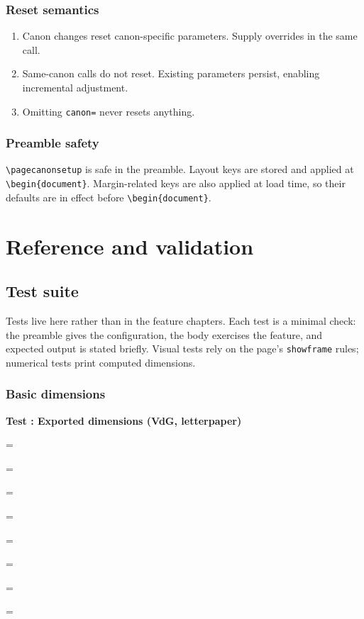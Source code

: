 \documentclass[11pt, twoside, openany]{book}
\newcommand{\showlen}[2]{\noindent\texttt{#1} = \the#2\par}
\newcommand{\cmd}[1]{\texttt{\textbackslash #1}}
\newcounter{testnum}
\newcommand{\test}[1]{%
  \stepcounter{testnum}%
  \par\medskip\noindent
  \textbf{Test \thetestnum: #1}\par\smallskip}
\begin{document}
\section{Reset semantics}\label{sec:reset}

\begin{enumerate}
	\item Canon changes reset canon-specific parameters. Supply overrides in the same call.
	\item Same-canon calls do not reset. Existing parameters persist, enabling incremental adjustment.
	\item Omitting \texttt{canon=} never resets anything.
\end{enumerate}

\section{Preamble safety}\label{sec:preamblesafety}

\cmd{pagecanonsetup} is safe in the preamble. Layout keys are stored and applied at \cmd{begin}\texttt{\{document\}}. Margin-related keys are also applied at load time, so their defaults are in effect before \cmd{begin}\texttt{\{document\}}.


\part{Reference and validation}\label{part:reference}


\chapter{Test suite}\label{chapter:testsuite}

Tests live here rather than in the feature chapters. Each test is a minimal check: the preamble gives the configuration, the body exercises the feature, and expected output is stated briefly. Visual tests rely on the page's \texttt{showframe} rules; numerical tests print computed dimensions.

\section{Basic dimensions}\label{sec:dimensions}

\test{Exported dimensions (VdG, letterpaper)}

\showlen{\string\textwidth}{\textwidth}
\showlen{\string\marginparwidth}{\marginparwidth}
\showlen{\string\marginparsep}{\marginparsep}
\showlen{\string\marginandtext}{\marginandtext}
\showlen{\string\marginandsep}{\marginandsep}
\showlen{\string\textandsep}{\textandsep}
\showlen{\string\fullwidthoverhang}{\fullwidthoverhang}
\showlen{\string\overflowingheadlen}{\overflowingheadlen}
\end{document}
